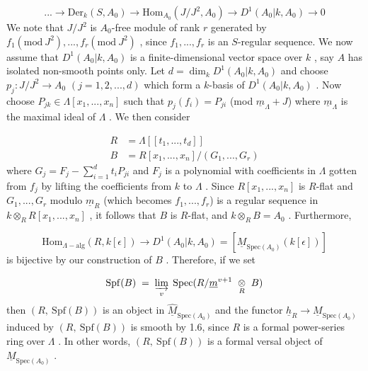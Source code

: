 \begin{equation*}
... \to \mathrm{Der}_k(S, A_0) \to \mathrm{Hom}_{A_0}(J/J^2, A_0) \to D^1(A_0|k, A_0) \to 0
\end{equation*}
We note that  $J/J^2$  is  $A_0$-free module of rank  $r$  generated by $f_1(\mathrm{mod}\ J^2),...,f_r(\mathrm{mod}\ J^2)$  , since  $f_1,...,f_r$  is an $S$-regular sequence. We now assume that  $D^1(A_0|k, A_0)$  is a finite-dimensional vector space over  $k$  , say  $A$ has isolated non-smooth points only. Let  $d = \dim_k D^1(A_0|k, A_0)$  and choose $p_j : J/J^2 \to A_0$   $(j = 1, 2,...,d)$  which form a $k$-basis of  $D^1(A_0|k, A_0)$  . Now choose  $P_{jk} \in \Lambda[x_1,...,x_n]$  such that  $p_j(f_i) = P_{ji}$  (mod $\underline{m}_\Lambda + J$)  where  $\underline{m}_\Lambda$  is the maximal ideal of  $\Lambda$  . We then consider

\begin{equation*}
\begin{aligned}
R &= \Lambda[[t_1,...,t_d]] \\
B &= R[x_1,...,x_n]/(G_1,...,G_r)
\end{aligned}
\end{equation*}
where  $G_j = F_j - \sum_{i=1}^{d} t_i P_{ji}$  and  $F_j$  is a polynomial with coefficients in  $\Lambda$ gotten from  $f_j$  by lifting the coefficients from  $k$  to  $\Lambda$  . Since $R[x_1,...,x_n]$  is $R$-flat and  $G_1,...,G_r$  modulo  $\underline{m}_R$  (which becomes  $f_1,...,f_r$) is a regular sequence in  $k \otimes_R R[x_1,...,x_n]$  , it follows that  $B$  is $R$-flat, and $k \otimes_R B = A_0$  . Furthermore,

\begin{equation*}
\mathrm{Hom}_{\Lambda-\mathrm{alg}}(R, k[\epsilon]) \to D^1(A_0|k, A_0) = [\underline{M}_{\mathrm{Spec}(A_0)}(k[\epsilon])]
\end{equation*}
is bijective by our construction of  $B$  . Therefore, if we set 



\begin{equation*}
 \mathrm{Spf}(B) \;=\; \varinjlim_{v}\; \mathrm{Spec}(R/\underline{m}^{v+1}\ \underset{R}{\otimes}\ B)
\end{equation*}
then  $(R,\ \mathrm{Spf}(B))$  is an object in  $\widehat{\underline{M}}_{\mathrm{Spec}(A_0)}$  and the functor  $\underline{h}_R \to \underline{M}_{\mathrm{Spec}(A_0)}$  induced by  $(R,\ \mathrm{Spf}(B))$  is smooth by 1.6, since  $R$  is a formal power-series ring over  $\Lambda$  . In other words,  $(R,\ \mathrm{Spf}(B))$  is a formal versal object of  $\underline{M}_{\mathrm{Spec}(A_0)}$  .

